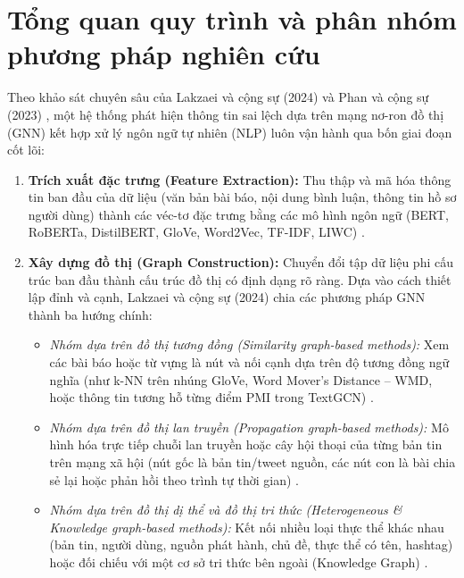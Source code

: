 \documentclass[11pt,a4paper]{extreport}
\begin{document}
\section{Tổng quan quy trình và phân nhóm phương pháp nghiên cứu}

Theo khảo sát chuyên sâu của Lakzaei và cộng sự (2024) \cite{noauthor_disinformation_2024} và Phan và cộng sự (2023) \cite{noauthor_fake_2023}, một hệ thống phát hiện thông tin sai lệch dựa trên mạng nơ-ron đồ thị (GNN) kết hợp xử lý ngôn ngữ tự nhiên (NLP) luôn vận hành qua bốn giai đoạn cốt lõi:
\begin{enumerate}
    \item \textbf{Trích xuất đặc trưng (Feature Extraction):} Thu thập và mã hóa thông tin ban đầu của dữ liệu (văn bản bài báo, nội dung bình luận, thông tin hồ sơ người dùng) thành các véc-tơ đặc trưng bằng các mô hình ngôn ngữ (BERT, RoBERTa, DistilBERT, GloVe, Word2Vec, TF-IDF, LIWC) \cite{noauthor_disinformation_2024, noauthor_dual_2025, noauthor_hybrid_2025}.
    \item \textbf{Xây dựng đồ thị (Graph Construction):} Chuyển đổi tập dữ liệu phi cấu trúc ban đầu thành cấu trúc đồ thị có định dạng rõ ràng. Dựa vào cách thiết lập đỉnh và cạnh, Lakzaei và cộng sự (2024) \cite{noauthor_disinformation_2024} chia các phương pháp GNN thành ba hướng chính:
    \begin{itemize}
        \item \textit{Nhóm dựa trên đồ thị tương đồng (Similarity graph-based methods):} Xem các bài báo hoặc từ vựng là nút và nối cạnh dựa trên độ tương đồng ngữ nghĩa (như k-NN trên nhúng GloVe, Word Mover's Distance -- WMD, hoặc thông tin tương hỗ từng điểm PMI trong TextGCN) \cite{noauthor_disinformation_2024, noauthor_fake_2024, noauthor_rumor_2024}.
        \item \textit{Nhóm dựa trên đồ thị lan truyền (Propagation graph-based methods):} Mô hình hóa trực tiếp chuỗi lan truyền hoặc cây hội thoại của từng bản tin trên mạng xã hội (nút gốc là bản tin/tweet nguồn, các nút con là bài chia sẻ lại hoặc phản hồi theo trình tự thời gian) \cite{noauthor_exploiting_2024, noauthor_early_2025, noauthor_integrating_2025}.
        \item \textit{Nhóm dựa trên đồ thị dị thể và đồ thị tri thức (Heterogeneous \& Knowledge graph-based methods):} Kết nối nhiều loại thực thể khác nhau (bản tin, người dùng, nguồn phát hành, chủ đề, thực thể có tên, hashtag) hoặc đối chiếu với một cơ sở tri thức bên ngoài (Knowledge Graph) \cite{noauthor_dual_2025, noauthor_improving_2025, cui_graph_2025, noauthor_semantic_2025}.

\end{itemize}
\end{enumerate}
\end{document}
